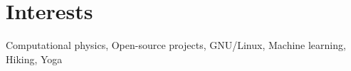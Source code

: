 \documentclass[a4paper]{twentysecondcv} %
\begin{document}
\section{Interests}

Computational physics, Open-source projects, GNU/Linux, Machine learning, Hiking, Yoga


%







\end{document}
